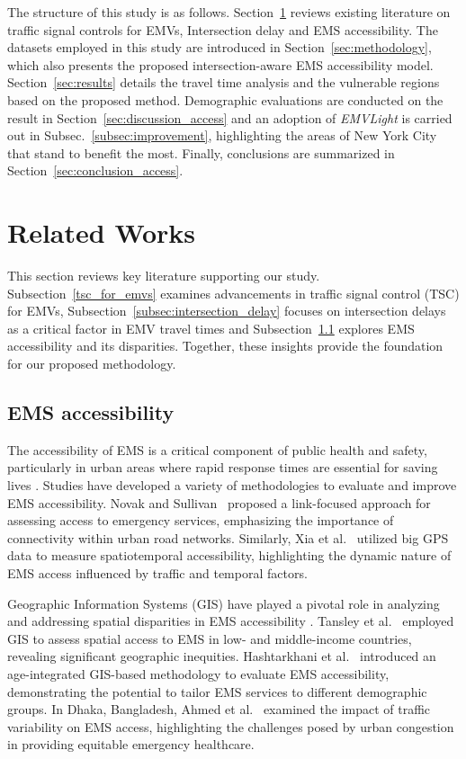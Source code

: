 The structure of this study is as follows. Section~\ref{sec:literature_review_access} reviews existing literature on traffic signal controls for EMVs, Intersection delay and EMS accessibility. The datasets employed in this study are introduced in Section~\ref{sec:methodology}, which also presents the proposed intersection-aware EMS accessibility model. Section~\ref{sec:results} details the travel time analysis and the vulnerable regions based on the proposed method. Demographic evaluations are conducted on the result in Section~\ref{sec:discussion_access} and an adoption of \textit{EMVLight} is carried out in Subsec.~\ref{subsec:improvement}, highlighting the areas of New York City that stand to benefit the most. Finally, conclusions are summarized in Section~\ref{sec:conclusion_access}.


\section{Related Works}
\label{sec:literature_review_access}
This section reviews key literature supporting our study. Subsection~\ref{tsc_for_emvs} examines advancements in traffic signal control (TSC) for EMVs, Subsection~\ref{subsec:intersection_delay} focuses on intersection delays as a critical factor in EMV travel times and Subsection~\ref{subsec:ems_accessibility} explores EMS accessibility and its disparities. Together, these insights provide the foundation for our proposed methodology.


\subsection{EMS accessibility}\label{subsec:ems_accessibility}
The accessibility of EMS is a critical component of public health and safety, particularly in urban areas where rapid response times are essential for saving lives \cite{yang2020nuset,ma2021undistillable,ma2021good,you2020towards,you2020contextualized,xu2021semantic}. Studies have developed a variety of methodologies to evaluate and improve EMS accessibility. Novak and Sullivan~\cite{novak2014link} proposed a link-focused approach for assessing access to emergency services, emphasizing the importance of connectivity within urban road networks. Similarly, Xia et al.~\cite{xia2019measuring} utilized big GPS data to measure spatiotemporal accessibility, highlighting the dynamic nature of EMS access influenced by traffic and temporal factors.

Geographic Information Systems (GIS) have played a pivotal role in analyzing and addressing spatial disparities in EMS accessibility \cite{you2022sbilsan,ma2022sparse,feng2022kergnns}. Tansley et al.~\cite{tansley2015spatial} employed GIS to assess spatial access to EMS in low- and middle-income countries, revealing significant geographic inequities. Hashtarkhani et al.~\cite{hashtarkhani2020age} introduced an age-integrated GIS-based methodology to evaluate EMS accessibility, demonstrating the potential to tailor EMS services to different demographic groups. In Dhaka, Bangladesh, Ahmed et al.~\cite{ahmed2019impact} examined the impact of traffic variability on EMS access, highlighting the challenges posed by urban congestion in providing equitable emergency healthcare.


